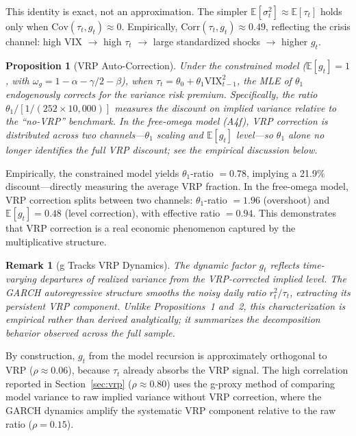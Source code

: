 \documentclass[12pt,a4paper]{article}
\newtheorem{proposition}{Proposition}
\newtheorem{remark}{Remark}
\newcommand{\E}{\mathbb{E}}
\begin{document}
This identity is exact, not an approximation. The simpler $\E[\sigma_t^2] \approx \E[\tau_t]$ holds only when $\mathrm{Cov}(\tau_t, g_t) \approx 0$. Empirically, $\mathrm{Corr}(\tau_t, g_t) \approx 0.49$, reflecting the crisis channel: high VIX $\to$ high $\tau_t$ $\to$ large standardized shocks $\to$ higher $g_t$.

\begin{proposition}[VRP Auto-Correction]
Under the constrained model ($\E[g_t]=1$, with $\omega_g = 1-\alpha-\gamma/2-\beta$), when $\tau_t = \theta_0 + \theta_1 \mathrm{VIX}_{t-1}^2$, the MLE of $\theta_1$ endogenously corrects for the variance risk premium. Specifically, the ratio $\theta_1 / [1/(252 \times 10{,}000)]$ measures the discount on implied variance relative to the ``no-VRP'' benchmark. In the free-omega model (A4f), VRP correction is distributed across two channels---$\theta_1$ scaling and $\E[g_t]$ level---so $\theta_1$ alone no longer identifies the full VRP discount; see the empirical discussion below.
\end{proposition}

Empirically, the constrained model yields $\theta_1$-ratio $= 0.78$, implying a 21.9\% discount---directly measuring the average VRP fraction. In the free-omega model, VRP correction splits between two channels: $\theta_1$-ratio $= 1.96$ (overshoot) and $\E[g_t] = 0.48$ (level correction), with effective ratio $= 0.94$. This demonstrates that VRP correction is a real economic phenomenon captured by the multiplicative structure.

\begin{remark}[g Tracks VRP Dynamics]
The dynamic factor $g_t$ reflects time-varying departures of realized variance from the VRP-corrected implied level. The GARCH autoregressive structure smooths the noisy daily ratio $r_t^2/\tau_t$, extracting its persistent VRP component. Unlike Propositions~1 and~2, this characterization is empirical rather than derived analytically; it summarizes the decomposition behavior observed across the full sample.
\end{remark}

By construction, $g_t$ from the model recursion is approximately orthogonal to VRP ($\rho \approx 0.06$), because $\tau_t$ already absorbs the VRP signal. The high correlation reported in Section~\ref{sec:vrp} ($\rho \approx 0.80$) uses the g-proxy method of comparing model variance to raw implied variance without VRP correction, where the GARCH dynamics amplify the systematic VRP component relative to the raw ratio ($\rho = 0.15$).
\end{document}
